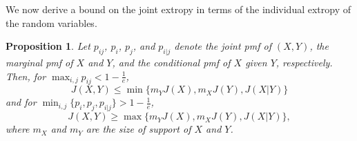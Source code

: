 \documentclass[pdflatex]{sn-jnl}%
\theoremstyle{thmstyleone}
\newtheorem{proposition}{Proposition}
\theoremstyle{thmstyletwo}%
\theoremstyle{thmstylethree}%
\begin{document}
\noindent We now derive a bound on the joint extropy in terms of the individual extropy of the random variables.
\begin{proposition}
    Let $p_{ij}$, $p_i$, $p_j$, and $p_{i|j}$ denote the joint pmf of $(X, Y)$, the marginal pmf of $X$ and $Y$, and the conditional pmf of $X$ given $Y$, respectively. Then, for $\max_{i,j}p_{ij} < 1-\frac{1}{e}$,
    \begin{equation}
        J\left( X, Y \right) \leq \min \{m_YJ(X), m_XJ(Y), J(X|Y) \}
    \end{equation}
    and for $\min_{i,j}\{p_i, p_j, p_{i|j}\}>1-\frac{1}{e}$, 
    \begin{equation}
        J\left( X, Y \right) \geq \max \{m_YJ(X), m_XJ(Y), J(X|Y) \},
    \end{equation}
    where $m_X$ and $m_Y$ are the size of support of $X$ and $Y$.
\end{proposition}
\end{document}
